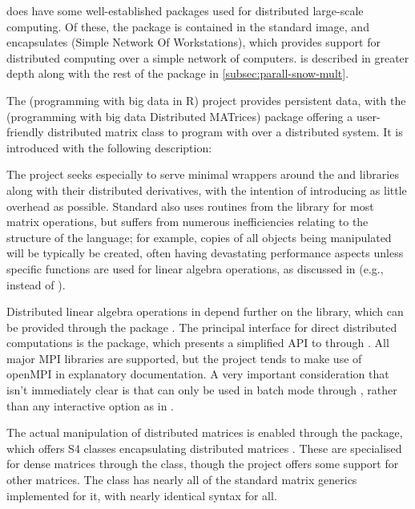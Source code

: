 \R{} does have some well-established packages used for distributed large-scale computing.
Of these, the  package is contained in the standard \R{} image, and encapsulates  (Simple Network Of Workstations), which provides support for distributed computing over a simple network of computers.
 is described in greater depth along with the rest of the  package in \cref{subsec:parall-snow-mult}.

The  (programming with big data in R) project provides persistent data, with the  (programming with big data Distributed MATrices) package offering a user-friendly distributed matrix class to program with over a distributed system.
It is introduced with the following description:


The project seeks especially to serve minimal wrappers around the  and  libraries along with their distributed derivatives, with the intention of introducing as little overhead as possible.
Standard \R{} also uses routines from the library for most matrix operations, but suffers from numerous inefficiencies relating to the structure of the language; for example, copies of all objects being manipulated will be typically be created, often having devastating performance aspects unless specific functions are used for linear algebra operations, as discussed in \textcite{schmidt2017programming} (e.g.,  instead of ).

Distributed linear algebra operations in  depend further on the  library, which can be provided through the  package \cite{Chen2012pbdSLAPpackage}.
The principal interface for direct distributed computations is the  package, which presents a simplified API to  through \R{} \cite{Chen2012pbdMPIpackage}.
All major MPI libraries are supported, but the project tends to make use of openMPI in explanatory documentation.
A very important consideration that isn't immediately clear is that  can only be used in batch mode through , rather than any interactive option as in  \cite{yu02:_rmpi}.

The actual manipulation of distributed matrices is enabled through the  package, which offers S4 classes encapsulating distributed matrices \cite{pbdDMATpackage}.
These are specialised for dense matrices through the  class, though the project offers some support for other matrices.
The  class has nearly all of the standard matrix generics implemented for it, with nearly identical syntax for all.

